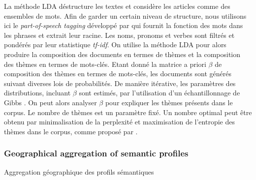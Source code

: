 {}{
La méthode LDA déstructure les textes et considère les articles comme des ensembles de mots. Afin de garder un certain niveau de structure, nous utilisons ici le \textit{part-of-speech tagging} développé par \cite{schmid1994probabilistic} qui fournit la fonction des mots dans les phrases et extrait leur racine. Les noms, pronoms et verbes sont filtrés et pondérés par leur statistique \textit{tf-idf}. On utilise la méthode LDA pour alors produire la composition des documents en termes de thèmes et la composition des thèmes en termes de mots-clés. Etant donné la matrice a priori $\beta$ de composition des thèmes en termes de mots-clés, les documents sont générés suivant diverses lois de probabilités. De manière itérative, les paramètres des distributions, incluant $\beta$ sont estimés, par l'utilisation d'un échantillonnage de Gibbs \cite{geman_stochastic_1984}. On peut alors analyser $\beta$ pour expliquer les thèmes présents dans le corpus. Le nombre de thèmes est un paramètre fixé. Un nombre optimal peut être obtenu par minimalisation de la perplexité et maximisation de l'entropie des thèmes dans le corpus, comme proposé par \cite{blei2003latent}.
}



\subsubsection{Geographical aggregation of semantic profiles}{Aggregation géographique des profils sémantiques}


